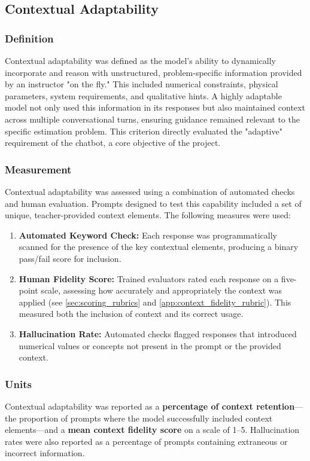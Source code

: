 \subsection{Contextual Adaptability}
\label{subsec:contextual_adaptability}

\subsubsection{Definition}
\label{subsubsec:contextual_definition}
Contextual adaptability was defined as the model's ability to dynamically incorporate and reason with unstructured, problem-specific information provided by an instructor "on the fly." This included numerical constraints, physical parameters, system requirements, and qualitative hints. A highly adaptable model not only used this information in its responses but also maintained context across multiple conversational turns, ensuring guidance remained relevant to the specific estimation problem. This criterion directly evaluated the "adaptive" requirement of the chatbot, a core objective of the project.

\subsubsection{Measurement}
\label{subsubsec:contextual_measurement}
Contextual adaptability was assessed using a combination of automated checks and human evaluation. Prompts designed to test this capability included a set of unique, teacher-provided context elements. The following measures were used:

\begin{enumerate}
    \item \textbf{Automated Keyword Check:} Each response was programmatically scanned for the presence of the key contextual elements, producing a binary pass/fail score for inclusion.
    \item \textbf{Human Fidelity Score:} Trained evaluators rated each response on a five-point scale, assessing how accurately and appropriately the context was applied (see \cref{sec:scoring_rubrics} and \cref{app:context_fidelity_rubric}). This measured both the inclusion of context and its correct usage.
    \item \textbf{Hallucination Rate:} Automated checks flagged responses that introduced numerical values or concepts not present in the prompt or the provided context.
\end{enumerate}

\subsubsection{Units}
\label{subsubsec:contextual_units}
Contextual adaptability was reported as a \textbf{percentage of context retention}—the proportion of prompts where the model successfully included context elements—and a \textbf{mean context fidelity score} on a scale of 1–5. Hallucination rates were also reported as a percentage of prompts containing extraneous or incorrect information.

